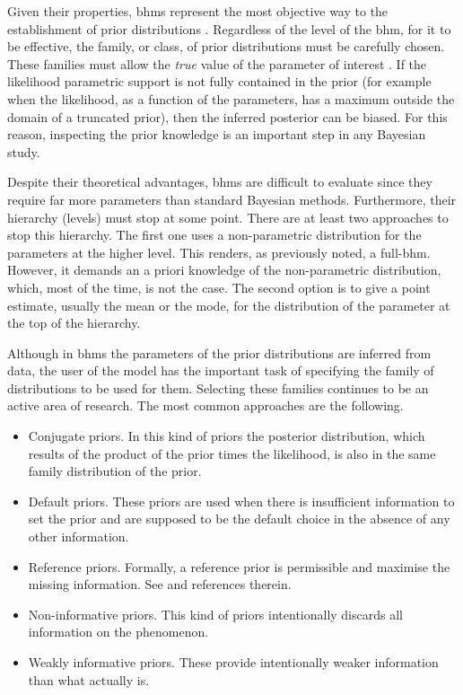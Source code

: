 Given their properties, \glspl{bhm}  represent the most objective way to the establishment of prior distributions \citep{Gelman2006}. Regardless of the level of the \gls{bhm}, for it to be effective, the family, or class, of prior distributions must be carefully chosen. These families must allow the \emph{true} value of the parameter of interest \citep{Morris1983}. If the likelihood {parametric support} is not fully contained in the prior (for example when the likelihood, as a function of the parameters, has a maximum outside the domain of a truncated prior), then the inferred posterior can be biased. For this reason, inspecting the prior knowledge is an important step in any Bayesian study.

Despite their theoretical advantages, \glspl{bhm}  are difficult to evaluate since they require far more parameters than standard Bayesian methods.
Furthermore, their hierarchy (levels) must stop at some point. There are at least two approaches to stop this hierarchy. The first one uses a non-parametric distribution for the parameters at the higher level. This renders, as previously noted, a full-\gls{bhm}. {However, it demands an a priori knowledge of the non-parametric distribution, which, most of the time, is not the case.} The second option is to give a point estimate, usually the mean or the mode, for the distribution of the parameter at the top of the hierarchy.  


Although in \glspl{bhm}  the parameters of the prior distributions are inferred from data, the user of the model has the important task of specifying the family of distributions to be used for them. Selecting these families continues to be an active area of research. The most common approaches are the following.

\begin{itemize}
\item Conjugate priors. In this kind of priors the posterior distribution, which results of the product of the prior times the likelihood, is also in the same family distribution of the prior. 

\item Default priors. These priors are used when there is insufficient information to set the prior and are supposed to be the default choice in the absence of any other information. 

\item Reference priors. Formally, a reference prior is permissible and maximise the missing information. See \citet{Berger2009} and references therein.

\item Non-informative priors. This kind of priors intentionally discards all information on the phenomenon.

\item Weakly informative priors. These provide intentionally weaker information than what actually is. 
\end{itemize}


